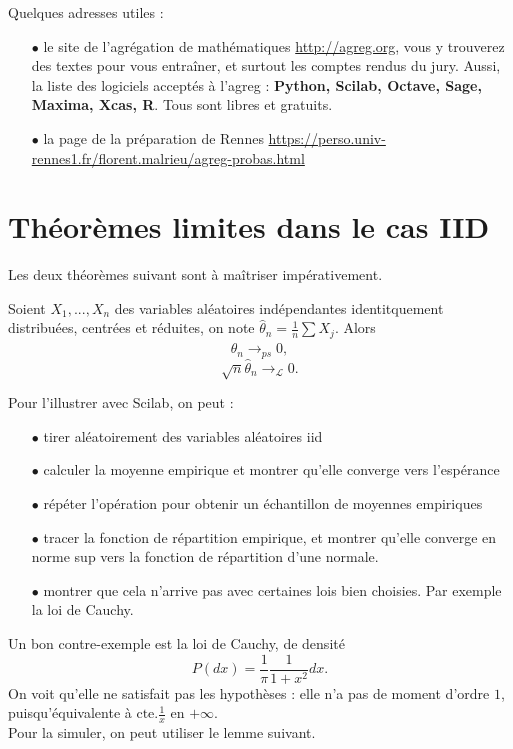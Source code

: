 Quelques adresses utiles :
\begin{itemize}
\item[$\bullet$]le site de l'agrégation de mathématiques \url{http://agreg.org}, vous y trouverez des textes pour vous entraîner, et surtout les comptes rendus du jury. Aussi, la liste des logiciels acceptés à l'agreg : \textbf{Python, Scilab, Octave, Sage, Maxima, Xcas, R}. Tous sont libres et gratuits.
\item[$\bullet$]la page de la préparation de Rennes  \url{https://perso.univ-rennes1.fr/florent.malrieu/agreg-probas.html}
\end{itemize}

\section{Théorèmes limites dans le cas IID}

Les deux théorèmes suivant sont à maîtriser impérativement.

\begin{thm}
Soient $X_1,...,X_n$ des variables aléatoires indépendantes identitquement distribuées, centrées et réduites, on note $\hat \theta_n =\frac{1}{n}\sum X_j$. Alors
\[\hat\theta_n\rightarrow _{ps}0,\]
\[\sqrt{n}\hat\theta_n\rightarrow _{\mathcal L}0.\] 
\end{thm}

Pour l'illustrer avec Scilab, on peut :\\

\begin{itemize}
\item[$\bullet$] tirer aléatoirement des variables aléatoires iid
\item[$\bullet$] calculer la moyenne empirique et montrer qu'elle converge vers l'espérance
\item[$\bullet$] répéter l'opération pour obtenir un échantillon de moyennes empiriques
\item[$\bullet$] tracer la fonction de répartition empirique, et montrer qu'elle converge en norme sup vers la fonction de répartition d'une normale. 
\item[$\bullet$] montrer que cela n'arrive pas avec certaines lois bien choisies. Par exemple la loi de Cauchy.\\
\end{itemize}

Un bon contre-exemple est la loi de Cauchy, de densité 
\[P(dx)=\frac{1}{\pi}\frac{1}{1+x^2}dx.\]
On voit qu'elle ne satisfait pas les hypothèses : elle n'a pas de moment d'ordre $1$, puisqu'équivalente à $\text{cte}.\frac{1}{x}$ en $+\infty$.\\ 
Pour la simuler, on peut utiliser le lemme suivant. 

